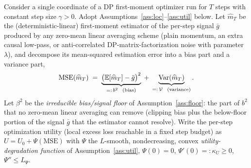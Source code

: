\begin{theorem}
\label{thm:signal-ceiling}
Consider a single coordinate of a DP first-moment optimizer run for $T$ steps with constant step
size $\gamma>0$. Adopt Assumptions~\ref{ass:loc}--\ref{ass:util} below. Let
$\widehat{m}_T$ be the (deterministic-linear) first-moment estimator of the per-step signal
$\bar g$ produced by any zero-mean linear averaging scheme (plain momentum, an extra causal
low-pass, or anti-correlated DP-matrix-factorization noise with parameter $\lambda$), and
decompose its mean-squared estimation error into a bias part and a variance part,
\[
\mathrm{MSE}(\widehat{m}_T)\;=\;\underbrace{\big(\E[\widehat{m}_T]-\bar g\big)^2}_{=:\,b^2\ \ (\text{bias})}\;+\;\underbrace{\Var(\widehat{m}_T)}_{=:\,\mathcal V\ \ (\text{variance})}.
\]
Let $\beta^2$ be the \emph{irreducible bias/signal floor} of Assumption~\ref{ass:floor}: the part
of $b^2$ that no zero-mean linear averaging can remove (clipping bias plus the below-floor portion
of the signal $\bar g$ that the estimator cannot resolve). Write the per-step optimization utility
(local excess loss reachable in a fixed step budget) as $U=U_0+\Psi(\mathrm{MSE})$ with $\Psi$ the
$L$-smooth, nondecreasing, convex \emph{utility-degradation function} of Assumption~\ref{ass:util},
$\Psi(0)=0$, $\Psi'(0)=:\kappa_U\ge 0$, $\Psi''\le L_\Psi$.


\end{theorem}
